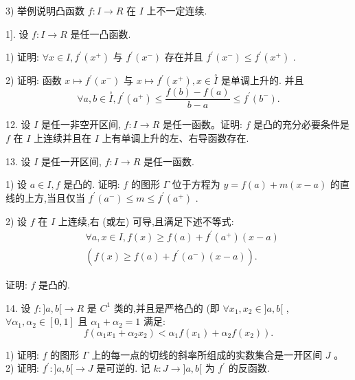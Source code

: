 3) 举例说明凸函数 $f : I \rightarrow  R$ 在 $I$ 上不一定连续.

1]. 设 $f : I \rightarrow  R$ 是任一凸函数.

1) 证明: $\forall x \in  I,{f}^{\prime }\left( {x}^{ + }\right)$ 与 ${f}^{\prime }\left( {x}^{ - }\right)$ 存在并且 ${f}^{\prime }\left( {x}^{ - }\right)  \leq  {f}^{\prime }\left( {x}^{ + }\right)$ .

2) 证明: 函数 $x \mapsto  {f}^{\prime }\left( {x}^{ - }\right)$ 与 $x \mapsto  {f}^{\prime }\left( {x}^{ + }\right) ,x \in  \overset{ \circ  }{I}$ 是单调上升的. 并且
$$\forall a,b \in  \overset{ \circ  }{I},{f}^{\prime }\left( {a}^{ + }\right)  \leq  \frac{f\left( b\right)  - f\left( a\right) }{b - a} \leq  {f}^{\prime }\left( {b}^{ - }\right) .$$

12. 设 $I$ 是任一非空开区间, $f : I \rightarrow  R$ 是任一函数。证明: $f$ 是凸的充分必要条件是 $f$ 在 $I$ 上连续并且在 $I$ 上有单调上升的左、右导函数存在.

13. 设 $I$ 是任一开区间, $f : I \rightarrow  R$ 是任一函数.

1) 设 $a \in  I,f$ 是凸的. 证明: $f$ 的图形 $\Gamma$ 位于方程为 $y = f\left( a\right)  + m\left( {x - a}\right)$ 的直线的上方,当且仅当 ${f}^{\prime }\left( {a}^{ - }\right)  \leq  m \leq  {f}^{\prime }\left( {a}^{ + }\right)$ .

2) 设 $f$ 在 $I$ 上连续,右 (或左) 可导,且满足下述不等式:
\begin{align*}
	&\forall a,x \in  I,f\left( x\right)  \geq  f\left( a\right)  + {f}^{\prime }\left( {a}^{ + }\right) \left( {x - a}\right)\\
	&\left( {f\left( x\right)  \geq  f\left( a\right)  + {f}^{\prime }\left( {a}^{ - }\right) \left( {x - a}\right) }\right) .
\end{align*}

证明: $f$ 是凸的.

14. 设 $f : \rbrack a,b\lbrack  \rightarrow  R$ 是 ${C}^{1}$ 类的,并且是严格凸的 (即 $\forall {x}_{1},{x}_{2} \in  \rbrack a,b\lbrack$ , $\forall {\alpha }_{1},{\alpha }_{2} \in  \left\lbrack  {0,1}\right\rbrack$ 且 ${\alpha }_{1} + {\alpha }_{2} = 1$ 满足:
$$\left. {f\left( {{\alpha }_{1}{x}_{1} + {\alpha }_{2}{x}_{2}}\right)  < {\alpha }_{1}f\left( {x}_{1}\right)  + {\alpha }_{2}f\left( {x}_{2}\right) }\right) .$$

1) 证明: $f$ 的图形 $\Gamma$ 上的每一点的切线的斜率所组成的实数集合是一开区间 $J$ 。 2) 证明: ${f}^{\prime } : \rbrack a,b\lbrack  \rightarrow  J$ 是可逆的. 记 $k : J \rightarrow  \rbrack a,b\lbrack$ 为 ${f}^{\prime }$ 的反函数.

